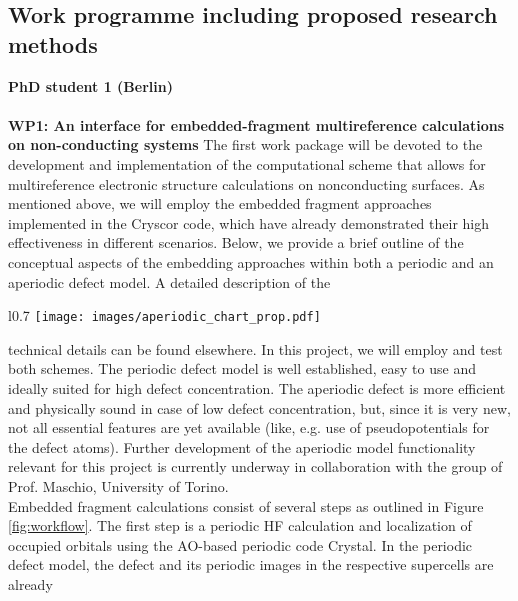\documentclass[a4paper,11pt,headings=normal]{scrartcl}
\begin{document}
\begin{itemize}
\subsection{Work programme including proposed research methods} 
\noindent
\textbf{PhD student 1 (Berlin)}\\
\ \\
\textbf{WP1: An interface for embedded-fragment multireference calculations on 
non-conducting systems} The first work package will be devoted to the development 
and implementation of the computational scheme that allows for multireference 
electronic structure calculations on nonconducting surfaces. As
mentioned above, we will employ the embedded fragment approaches implemented in 
the Cryscor code, which have already demonstrated their high effectiveness in 
different scenarios.\autocite{masur2016, schutz2017, usvyat18, mullan21, 
christlmaier21, Lavroff2024} Below, we provide a brief outline of the conceptual 
aspects of the embedding approaches within both a periodic and an aperiodic 
defect model. A detailed description of the 
\begin{wrapfigure}{l}{0.7\textwidth}
	\centering
	\vspace{-0.5em}
	\texttt{[image: images/aperiodic\_chart\_prop.pdf]}
	\caption{Periodic and aperiodic defect models and the workflows of the 
	corresponding embedded fragment calculations} 
	\label{fig:workflow}
	\vspace{-1.5em}
\end{wrapfigure}
technical details can be found 
elsewhere.\autocite{christlmaier21,Lavroff2024} In this project, we will employ 
and test both schemes.
The periodic defect model is well established, easy to 
use and ideally suited for high defect concentration. The aperiodic 
defect is more efficient and physically sound in case of low defect 
concentration, but, since it is very new, not all essential features are yet 
available (like, e.g. use of pseudopotentials for the defect atoms).
Further 
development of the aperiodic model functionality relevant for this project is 
currently underway in collaboration with the group of Prof. Maschio, University 
of Torino.\\
Embedded fragment calculations consist of several steps as outlined in Figure 
\ref{fig:workflow}.
The first step is a periodic HF calculation and  
localization of occupied orbitals using the AO-based periodic code Crystal.\autocite{Crystal17} In the periodic defect model, the defect and its periodic images in the respective supercells are already 

\end{itemize}
\end{document}
